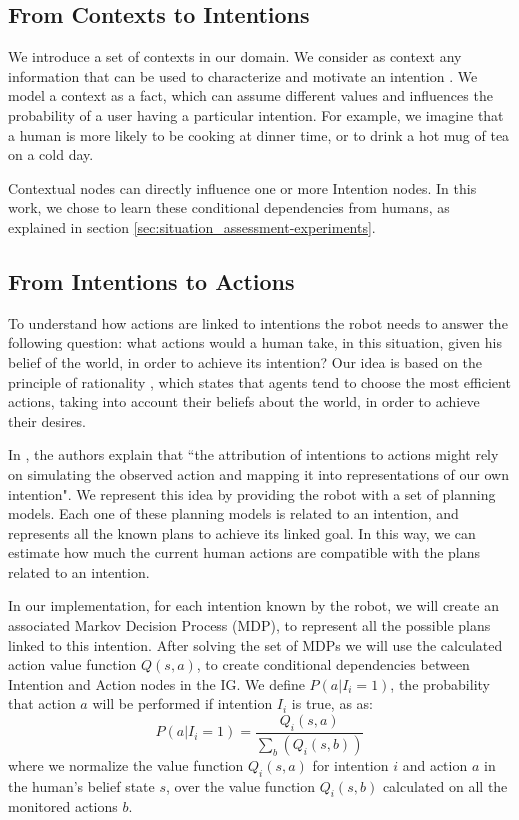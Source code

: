 \subsection{From Contexts to Intentions}
We introduce a set of contexts in our domain. We consider as context any information that can be used to characterize and motivate an intention \cite{abowd1999towards}. We model a context  as a fact, which can assume different values and influences the probability of a user having a particular intention. For example, we imagine that a human is more likely to be cooking at dinner time, or to drink a hot mug of tea on a cold day.

Contextual nodes can directly influence one or more Intention nodes. In this work, we chose to learn these conditional dependencies from humans, as explained in section \ref{sec:situation_assessment-experiments}.

\subsection{From Intentions to Actions}
\label{sec:situation_assessment-action_evaluation}
To understand how actions are linked to intentions the robot needs to answer the following question: what actions would a human take, in this situation, given his belief of the world, in order to achieve its intention?
Our idea is based on the principle of rationality \cite{Dennet1989}, which states that agents tend to choose the most efficient actions, taking into account their beliefs about the world, in order to achieve their desires.

In \cite{Blakemore2001}, the authors explain that ``the attribution of intentions to actions might rely on simulating the observed action and mapping it into representations of our own intention". We represent this idea by providing the robot with a set of planning models. Each one of these planning models is related to an intention, and represents all the known plans to achieve its linked goal. In this way, we can estimate how much the current human actions are compatible with the plans related to an intention.

In our implementation, for each intention known by the robot, we will create an associated Markov Decision Process (MDP), to represent all the possible plans linked to this intention. After solving the set of MDPs we will use the calculated action value function \(Q(s,a)\), to create conditional dependencies between Intention and Action nodes in the IG. We define \(P(a|I_i=1)\), the probability that action $a$ will be performed if intention $I_i$ is true, as as:
\begin{equation}
 P(a|I_i=1)=\frac{Q_i(s,a)}{\sum_b(Q_i(s,b))}
\end{equation}
  where we normalize the value function $Q_i(s,a)$ for intention $i$ and action $a$ in the human's belief state $s$, over the value function $Q_i(s,b)$ calculated on all the monitored actions $b$. 

